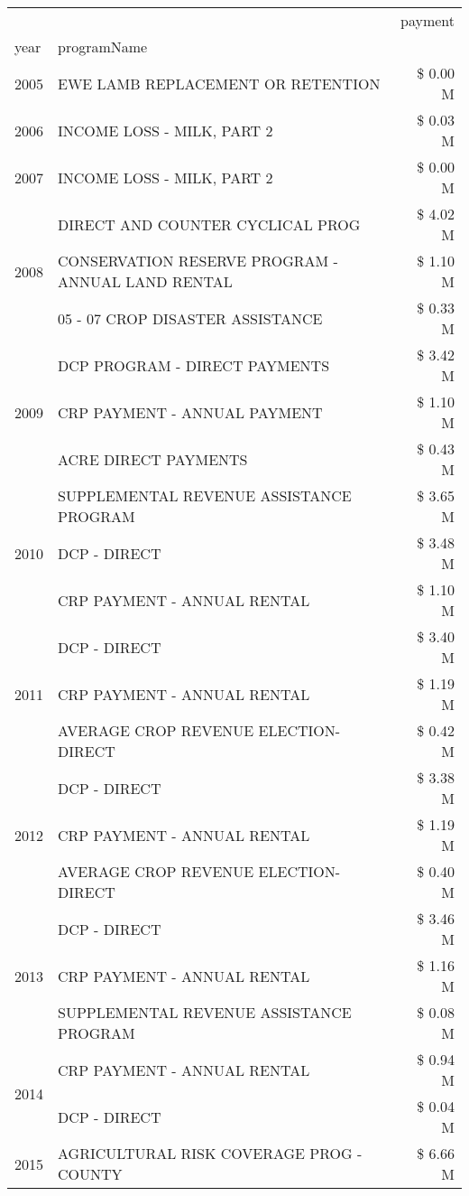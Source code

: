 \begin{tabular}{llr}
\toprule
 &  & payment \\
year & programName &  \\
\midrule
2005 & EWE LAMB REPLACEMENT OR RETENTION & \$ 0.00 M \\
\cline{1-3}
2006 & INCOME LOSS - MILK, PART 2 & \$ 0.03 M \\
\cline{1-3}
2007 & INCOME LOSS - MILK, PART 2 & \$ 0.00 M \\
\cline{1-3}
\multirow[t]{3}{*}{2008} & DIRECT AND COUNTER CYCLICAL PROG & \$ 4.02 M \\
 & CONSERVATION RESERVE PROGRAM - ANNUAL LAND RENTAL & \$ 1.10 M \\
 & 05 - 07 CROP DISASTER ASSISTANCE & \$ 0.33 M \\
\cline{1-3}
\multirow[t]{3}{*}{2009} & DCP PROGRAM - DIRECT PAYMENTS & \$ 3.42 M \\
 & CRP PAYMENT - ANNUAL PAYMENT & \$ 1.10 M \\
 & ACRE DIRECT PAYMENTS & \$ 0.43 M \\
\cline{1-3}
\multirow[t]{3}{*}{2010} & SUPPLEMENTAL REVENUE ASSISTANCE PROGRAM & \$ 3.65 M \\
 & DCP - DIRECT & \$ 3.48 M \\
 & CRP PAYMENT - ANNUAL RENTAL & \$ 1.10 M \\
\cline{1-3}
\multirow[t]{3}{*}{2011} & DCP - DIRECT & \$ 3.40 M \\
 & CRP PAYMENT - ANNUAL RENTAL & \$ 1.19 M \\
 & AVERAGE CROP REVENUE ELECTION-DIRECT & \$ 0.42 M \\
\cline{1-3}
\multirow[t]{3}{*}{2012} & DCP - DIRECT & \$ 3.38 M \\
 & CRP PAYMENT - ANNUAL RENTAL & \$ 1.19 M \\
 & AVERAGE CROP REVENUE ELECTION-DIRECT & \$ 0.40 M \\
\cline{1-3}
\multirow[t]{3}{*}{2013} & DCP - DIRECT & \$ 3.46 M \\
 & CRP PAYMENT - ANNUAL RENTAL & \$ 1.16 M \\
 & SUPPLEMENTAL REVENUE ASSISTANCE PROGRAM & \$ 0.08 M \\
\cline{1-3}
\multirow[t]{2}{*}{2014} & CRP PAYMENT - ANNUAL RENTAL & \$ 0.94 M \\
 & DCP - DIRECT & \$ 0.04 M \\
\cline{1-3}
\multirow[t]{3}{*}{2015} & AGRICULTURAL RISK COVERAGE PROG - COUNTY & \$ 6.66 M \\

\end{tabular}
